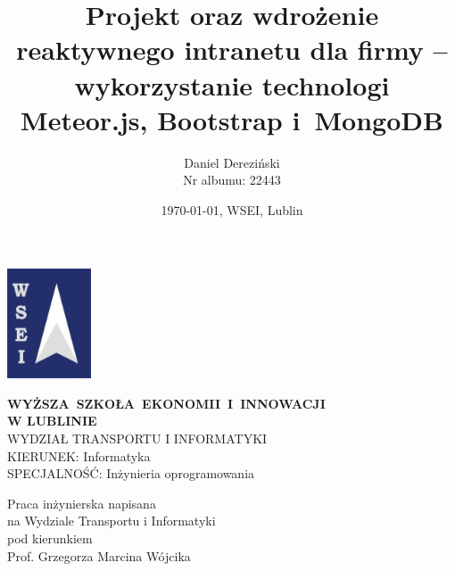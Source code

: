 \title{Projekt oraz wdrożenie reaktywnego intranetu dla firmy – wykorzystanie technologi Meteor.js, Bootstrap i~MongoDB}
\author{Daniel Dereziński \\ Nr albumu: 22443 \\ }
\date{\today, WSEI, Lublin}

\makeatletter
\newcommand{\linia}{\rule{\linewidth}{0.4mm}}
\renewcommand{\maketitle}{\begin{titlepage}
\setlength{\topmargin}{-1cm}
    \begin{center}\small
	\includegraphics[width=25mm]{./title/logowsei.jpg}
    \end{center}
    \begin{center}
	\large{\bf{WYŻSZA~SZKOŁA~EKONOMII~I~INNOWACJI \\ W LUBLINIE}} \\
	\vspace{0,5cm}
	\large{WYDZIAŁ TRANSPORTU I INFORMATYKI \\KIERUNEK: Informatyka\\ SPECJALNOŚĆ: Inżynieria oprogramowania}\\
	\vspace{0.5cm}
    \@author
	\huge{\bf{\it\@title}}
    \end{center}
	\vspace{1.0cm}
	\flushright Praca inżynierska napisana\\na Wydziale Transportu i Informatyki\\pod kierunkiem\\Prof. Grzegorza Marcina Wójcika
	\vspace{2.5cm}
	\center\@date
  \end{titlepage}%
}

\newpage
{}
\maketitle

